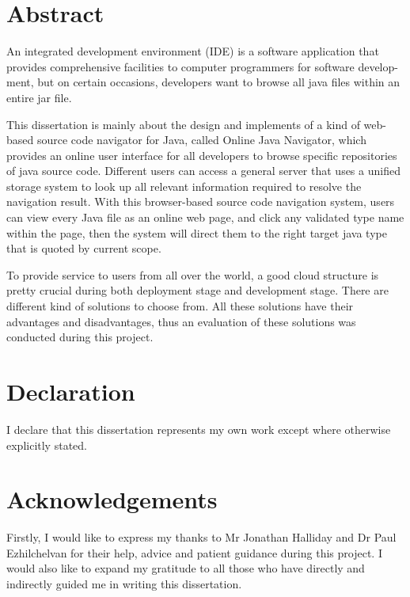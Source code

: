 \documentclass[runningheads]{llncs}
\begin{document}
\newpage
{}
\setcounter{page}{2}
\section{Abstract}

An integrated development environment (IDE) is a software application that provides comprehensive facilities to computer programmers for software develop-ment\cite{Integrated_development_environment}, but on certain occasions, developers want to browse all java files within an entire jar file.

This dissertation is mainly about the design and implements of a kind of web-based source code navigator for Java, called Online Java Navigator, which provides an online user interface for all developers to browse specific repositories of java source code. Different users can access a general server that uses a unified storage system to look up all relevant information required to resolve the navigation result. With this browser-based source code navigation system, users can view every Java file as an online web page, and click any validated type name within the page, then the system will direct them to the right target java type that is quoted by current scope.

To provide service to users from all over the world, a good cloud structure is pretty crucial during both deployment stage and development stage. There are different kind of solutions to choose from. All these solutions have their advantages and disadvantages, thus an evaluation of these solutions was conducted during this project.

\section{Declaration}

I declare that this dissertation represents my own work except where otherwise explicitly stated.

\newpage
\section{Acknowledgements}

Firstly, I would like to express my thanks to Mr Jonathan Halliday and Dr Paul Ezhilchelvan for their help, advice and patient guidance during this project. I would also like to expand my gratitude to all those who have directly and indirectly guided me in writing this dissertation.
\end{document}
